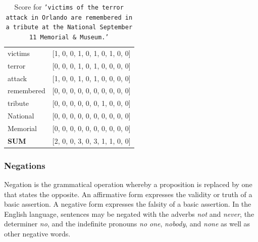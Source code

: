 \documentclass[11pt]{article}
\begin{document}
\begin{table}[hbt]
\centering


\begin{tabular}{ll}

victims                            & {[}1, 0, 0, 1, 0, 1, 0, 1, 0, 0{]}                               \\
terror                             & {[}0, 0, 0, 1, 0, 1, 0, 0, 0, 0{]}                               \\
attack                             & {[}1, 0, 0, 1, 0, 1, 0, 0, 0, 0{]}                               \\
remembered                         & {[}0, 0, 0, 0, 0, 0, 0, 0, 0, 0{]}                               \\
tribute                            & {[}0, 0, 0, 0, 0, 0, 1, 0, 0, 0{]}                               \\
National                           & {[}0, 0, 0, 0, 0, 0, 0, 0, 0, 0{]}                               \\
Memorial                           & {[}0, 0, 0, 0, 0, 0, 0, 0, 0, 0{]}                               \\ \hline
\textbf{SUM} & {[}2, 0, 0, 3, 0, 3, 1, 1, 0, 0{]} \\ 
\end{tabular}
\caption{Score for \texttt{'victims of the terror attack in Orlando are remembered in a tribute at the National September 11 Memorial \& Museum.'}}
\label{feature_lexicon}
\end{table}


\subsubsection{Negations}
Negation is the grammatical operation whereby a proposition is replaced by one that states the opposite. An affirmative form expresses the validity or truth of a basic assertion. A negative form expresses the falsity of a basic assertion. In the English language, sentences may be negated with the adverbs \textit{not} and \textit{never}, the determiner \textit{no}, and the indefinite pronouns \textit{no one}, \textit{nobody}, and \textit{none} as well as other negative words.
\end{document}
